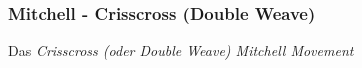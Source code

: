 \subsubsection{Mitchell - Crisscross (Double Weave)}

\noindent
Das \textit{Crisscross (oder Double Weave) Mitchell Movement}

